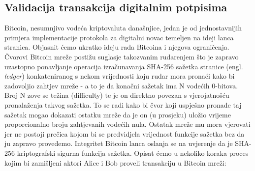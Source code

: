 \documentclass[utf8, zavrsni]{fer}
\begin{document}
\subsection{Validacija transakcija digitalnim potpisima}
Bitcoin, nesumnjivo vodeća kriptovaluta današnjice, jedan je od jednostavnijih primjera implementacije protokola za digitalni novac temeljen na ideji lanca stranica. Objasnit ćemo ukratko ideju rada Bitcoina i njegova ograničenja. Čvorovi Bitcoin mreže postižu suglasje takozvanim rudarenjem što je zapravo uzastopno ponavljanje operacija izračunavanja SHA-256 sažetka stranice (engl. \textit{ledger}) konkateniranog s nekom vrijednosti koju rudar mora pronaći kako bi zadovoljio zahtjev mreže - a to je da konačni sažetak ima N vodećih 0-bitova. Broj N zove se težina (difficulty) te je on direktno povezan s vjerojatnošću pronalaženja takvog sažetka. To se radi kako bi čvor koji uspješno pronađe taj sažetak mogao dokazati ostatku mreže da je on (u prosjeku) uložio vrijeme proporcionalno broju zahtjevanih vodećih nula. Ostatak mreže mu mora vjerovati jer ne postoji prečica kojom bi se predvidjela vrijednost funkcije sažetka bez da ju zapravo provedemo. Integritet Bitcoin lanca oslanja se na uvjerenje da je SHA-256 kriptografski sigurna funkcija sažetka. Opisat ćemo u nekoliko koraka proces kojim bi zamišljeni aktori Alice i Bob proveli transakciju u Bitcoin mreži:
\end{document}

